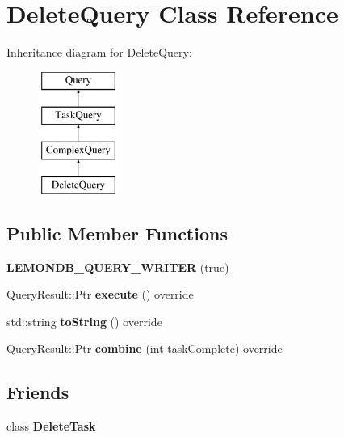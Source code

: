 \hypertarget{class_delete_query}{}\section{Delete\+Query Class Reference}
\label{class_delete_query}
Inheritance diagram for Delete\+Query\+:\begin{figure}[H]
\begin{center}
\leavevmode
\includegraphics[height=4.000000cm]{class_delete_query}
\end{center}
\end{figure}
\subsection*{Public Member Functions}
\begin{DoxyCompactItemize}
\item 
\mbox{\label{class_delete_query_aa95925b0055f7a3e502dd33914a9d091}} 
{\bfseries L\+E\+M\+O\+N\+D\+B\+\_\+\+Q\+U\+E\+R\+Y\+\_\+\+W\+R\+I\+T\+ER} (true)
\item 
\mbox{\label{class_delete_query_a2f534f7366326b3aa84ee640f4072b98}} 
Query\+Result\+::\+Ptr {\bfseries execute} () override
\item 
\mbox{\label{class_delete_query_a481620086e9d7560dbb6296876f6dcf1}} 
std\+::string {\bfseries to\+String} () override
\item 
\mbox{\label{class_delete_query_ab36de51aead741d72069d1a95214c4cb}} 
Query\+Result\+::\+Ptr {\bfseries combine} (int \hyperlink{class_task_query_a3dc3e4c56ddea8ff025239fd9da358d3}{task\+Complete}) override
\end{DoxyCompactItemize}
\subsection*{Friends}
\begin{DoxyCompactItemize}
\item 
\mbox{\label{class_delete_query_ad20f61684a9dbe6fbec924694ed7068c}} 
class {\bfseries Delete\+Task}
\end{DoxyCompactItemize}
